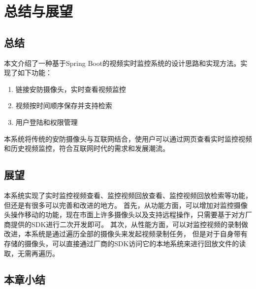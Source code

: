 \chapter{总结与展望}
\section{总结}
本文介绍了一种基于Spring Boot的视频实时监控系统的设计思路和实现方法。实现了如下功能：
\begin{enumerate}
    \item 链接安防摄像头，实时查看视频监控
    \item 视频按时间顺序保存并支持检索
    \item 用户登陆和权限管理
\end{enumerate}

本系统将传统的安防摄像头与互联网结合，使用户可以通过网页查看实时监控视频和历史视频监控，符合互联网时代的需求和发展潮流。

\section{展望}
本系统实现了实时监控视频查看、监控视频回放查看、监控视频回放检索等功能，但还是有很多可以完善和改进的地方。
首先，从功能方面，可以增加对监控摄像头操作移动的功能，现在市面上许多摄像头以及支持远程操作，只需要基于对方厂商提供的SDK进行二次开发即可。
其次，从性能方面，可以对监控视频的录制做改进，本系统是通过遍历全部的摄像头来发起视频录制任务，
但是对于自身带有存储的摄像头，可以直接通过厂商的SDK访问它的本地系统来进行回放文件的读取，无需再遍历。

\section{本章小结}